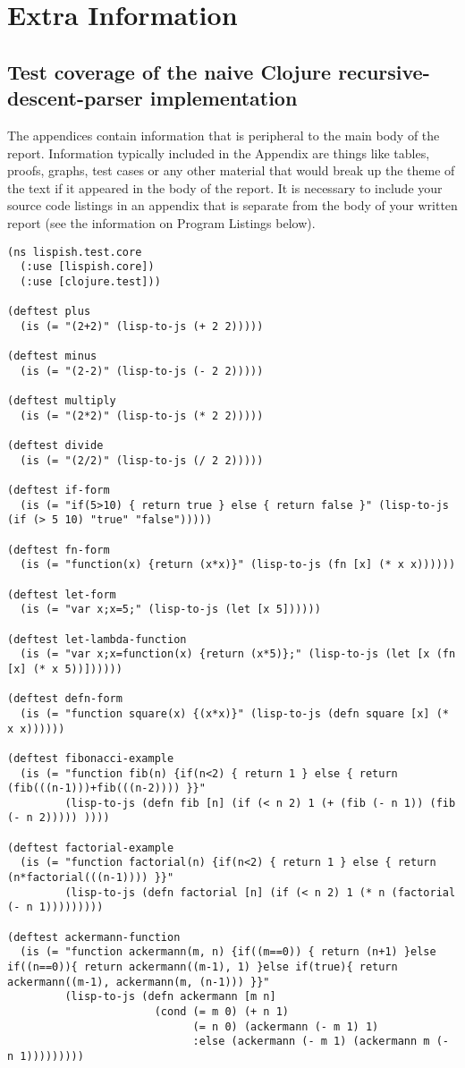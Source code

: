 

\chapter{Extra Information}
\section{Test coverage of the naive Clojure recursive-descent-parser implementation}
The appendices contain information that is peripheral to the main body of the report. Information typically included in the Appendix are things like tables, proofs, graphs, test cases or any other material that would break up the theme of the text if it appeared in the body of the report. It is necessary to include your source code listings in an appendix that is separate from the body of your written report (see the information on Program Listings below).

\begin{verbatim}
(ns lispish.test.core
  (:use [lispish.core])
  (:use [clojure.test]))

(deftest plus
  (is (= "(2+2)" (lisp-to-js (+ 2 2)))))

(deftest minus
  (is (= "(2-2)" (lisp-to-js (- 2 2)))))

(deftest multiply
  (is (= "(2*2)" (lisp-to-js (* 2 2)))))

(deftest divide
  (is (= "(2/2)" (lisp-to-js (/ 2 2)))))

(deftest if-form
  (is (= "if(5>10) { return true } else { return false }" (lisp-to-js (if (> 5 10) "true" "false")))))

(deftest fn-form
  (is (= "function(x) {return (x*x)}" (lisp-to-js (fn [x] (* x x))))))

(deftest let-form
  (is (= "var x;x=5;" (lisp-to-js (let [x 5])))))

(deftest let-lambda-function
  (is (= "var x;x=function(x) {return (x*5)};" (lisp-to-js (let [x (fn [x] (* x 5))])))))

(deftest defn-form
  (is (= "function square(x) {(x*x)}" (lisp-to-js (defn square [x] (* x x))))))

(deftest fibonacci-example
  (is (= "function fib(n) {if(n<2) { return 1 } else { return (fib(((n-1)))+fib(((n-2)))) }}"
         (lisp-to-js (defn fib [n] (if (< n 2) 1 (+ (fib (- n 1)) (fib (- n 2))))) ))))

(deftest factorial-example
  (is (= "function factorial(n) {if(n<2) { return 1 } else { return (n*factorial(((n-1)))) }}"
         (lisp-to-js (defn factorial [n] (if (< n 2) 1 (* n (factorial (- n 1)))))))))

(deftest ackermann-function
  (is (= "function ackermann(m, n) {if((m==0)) { return (n+1) }else if((n==0)){ return ackermann((m-1), 1) }else if(true){ return ackermann((m-1), ackermann(m, (n-1))) }}"
         (lisp-to-js (defn ackermann [m n]
                       (cond (= m 0) (+ n 1)
                             (= n 0) (ackermann (- m 1) 1)
                             :else (ackermann (- m 1) (ackermann m (- n 1)))))))))

\end{verbatim}
